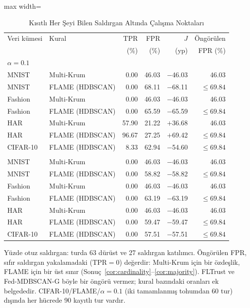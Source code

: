\begin{table}[!t]
\centering\footnotesize
\setlength{\tabcolsep}{4pt}
\caption{Kısıtlı Her Şeyi Bilen Saldırgan Altında Çalışma Noktaları}\label{tab:constrained}
\begin{adjustbox}{max width=\columnwidth}
\begin{tabular}{llrrrr}
\toprule
Veri kümesi & Kural & TPR & FPR & $J$ & Öngörülen \\
 &  & (\%) & (\%) & (yp) & FPR (\%) \\
\midrule
\multicolumn{6}{l}{\emph{$\alpha=0.1$}} \\
\quad MNIST & Multi-Krum & 0.00 & 46.03 & $-$46.03 & 46.03 \\
\quad MNIST & FLAME (HDBSCAN) & 0.00 & 68.11 & $-$68.11 & $\leq69.84$ \\
\quad Fashion & Multi-Krum & 0.00 & 46.03 & $-$46.03 & 46.03 \\
\quad Fashion & FLAME (HDBSCAN) & 0.00 & 65.59 & $-$65.59 & $\leq69.84$ \\
\quad HAR & Multi-Krum & 57.90 & 21.22 & $+$36.68 & 46.03 \\
\quad HAR & FLAME (HDBSCAN) & 96.67 & 27.25 & $+$69.42 & $\leq69.84$ \\
\quad CIFAR-10 & FLAME (HDBSCAN) & 8.33 & 62.94 & $-$54.60 & $\leq69.84$ \\
\addlinespace[3pt]
\multicolumn{6}{l}{\emph{$\alpha=0.01$}} \\
\quad MNIST & Multi-Krum & 0.00 & 46.03 & $-$46.03 & 46.03 \\
\quad MNIST & FLAME (HDBSCAN) & 0.00 & 58.82 & $-$58.82 & $\leq69.84$ \\
\quad Fashion & Multi-Krum & 0.00 & 46.03 & $-$46.03 & 46.03 \\
\quad Fashion & FLAME (HDBSCAN) & 0.00 & 63.19 & $-$63.19 & $\leq69.84$ \\
\quad HAR & Multi-Krum & 0.00 & 46.03 & $-$46.03 & 46.03 \\
\quad HAR & FLAME (HDBSCAN) & 0.00 & 59.47 & $-$59.47 & $\leq69.84$ \\
\quad CIFAR-10 & FLAME (HDBSCAN) & 0.00 & 57.51 & $-$57.51 & $\leq69.84$ \\
\bottomrule
\end{tabular}
\end{adjustbox}

\par\vspace{3pt}\parbox{\linewidth}{\footnotesize Yüzde otuz saldırgan: turda 63 dürüst ve 27 saldırgan katılımcı. Öngörülen FPR, sıfır saldırgan yakalamadaki ($\mathrm{TPR}=0$) değerdir: Multi-Krum için bir özdeşlik, FLAME için bir üst sınır (Sonuç~\ref{cor:cardinality}--\ref{cor:majority}). FLTrust ve Fed-MDBSCAN-G böyle bir öngörü vermez; kural bazındaki oranları ek belgededir. CIFAR-10/FLAME/$\alpha=0.1$ (iki tamamlanmış tohumdan 60 tur) dışında her hücrede 90 kayıtlı tur vardır.}
\end{table}
